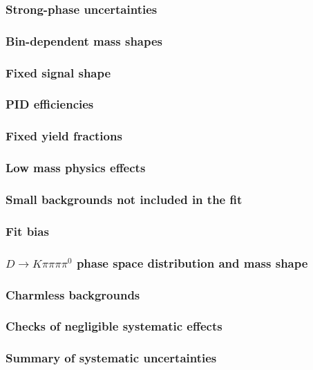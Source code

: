 \documentclass[12pt, a4paper, notitlepage, onecolumn]{article}
\begin{document}
\subsubsection{Strong-phase uncertainties}
\subsubsection{Bin-dependent mass shapes}
\subsubsection{Fixed signal shape}
\subsubsection{PID efficiencies}
\subsubsection{Fixed yield fractions}
\subsubsection{Low mass physics effects}
\subsubsection{Small backgrounds not included in the fit}
\subsubsection{Fit bias}
\subsubsection{\texorpdfstring{$D\to K\pi\pi\pi\pi^0$}{D2Kpipipipi0} phase space distribution and mass shape}
\subsubsection{Charmless backgrounds}
\subsubsection{Checks of negligible systematic effects}
\subsubsection{Summary of systematic uncertainties}
\end{document}
